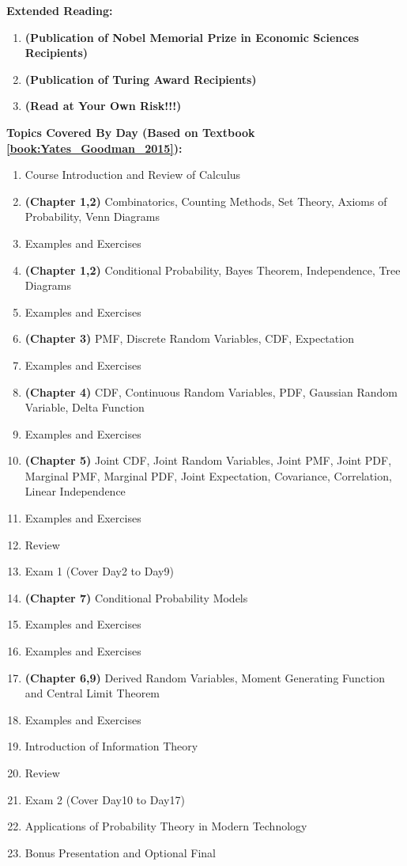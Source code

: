 \documentclass{article}
\begin{document}
\textbf{Extended Reading:}{
    \begin{enumerate}
            \item \textbf{(Publication of Nobel Memorial Prize in Economic Sciences Recipients)} 
            \item \textbf{(Publication of Turing Award Recipients)} 
            \item \textbf{(Read at Your Own Risk!!!)} 
    \end{enumerate}
}

\textbf{Topics Covered By Day (Based on Textbook \cref{book:Yates_Goodman_2015}):} {
    \begin{enumerate}
        \item Course Introduction and Review of Calculus
        \item \textbf{(Chapter 1,2)} Combinatorics, Counting Methods, Set Theory, Axioms of Probability, Venn Diagrams
        \item Examples and Exercises
        \item \textbf{(Chapter 1,2)} Conditional Probability, Bayes Theorem, Independence, Tree Diagrams
        \item Examples and Exercises
        \item \textbf{(Chapter 3)} PMF, Discrete Random Variables, CDF, Expectation
        \item Examples and Exercises
        \item \textbf{(Chapter 4)} CDF, Continuous Random Variables, PDF, Gaussian Random Variable, Delta Function
        \item Examples and Exercises
        \item \textbf{(Chapter 5)} Joint CDF, Joint Random Variables, Joint PMF, Joint PDF, Marginal PMF, Marginal PDF, Joint Expectation, Covariance, Correlation, Linear Independence
        \item Examples and Exercises
        \item Review
        \item Exam 1 (Cover Day2 to Day9)
        \item \textbf{(Chapter 7)} Conditional Probability Models
        \item Examples and Exercises
        \item Examples and Exercises
        \item \textbf{(Chapter 6,9)} Derived Random Variables, Moment Generating Function and Central Limit Theorem
        \item Examples and Exercises
        \item Introduction of Information Theory
        \item Review
        \item Exam 2 (Cover Day10 to Day17)
        \item Applications of Probability Theory in Modern Technology
        \item Bonus Presentation and Optional Final
    \end{enumerate}
}
\end{document}
